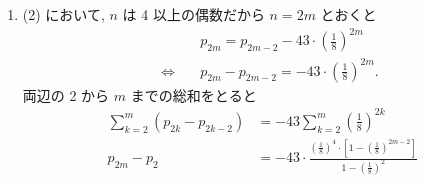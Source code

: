 \begin{qenumerate}
{\begin{enumerate}
{\begin{enumerate}
					\item{
						$n - 2$ 回さいころを投げた時点で $x_{n - 2} < \dfrac{8}{33}$ かつ $x_{n - 2}\neq 0.\underbrace{24\dots 24}_{n - 2}$ である場合, $n - 1$ 回目と $n$ 回目の出た目に関わらず $x_{n} < \dfrac{8}{33}$ を満たす.
						この確率を $p'_{n}$ とおくと, $x_{n - 2} < \dfrac{8}{33}$ となる確率は $p_{n - 2}$ であり, $x_{n - 2} = 0.\underbrace{24\dots 24}_{n - 2}$ となる確率は $\left(\dfrac{1}{8}\right)^{n - 2}$ だから
						\begin{align}
							p'_{n} = p_{n - 2} - \left(\frac{1}{8}\right)^{n - 2}.
						\end{align}
					}
					\item{
						$n - 2$ 回さいころを投げた時点で $x_{n - 2} = 0.\underbrace{24\dots 24}_{n - 2}$ である場合, $n - 1$ 回目, $n$ 回目の出る目が (1) と同様のときに $x_{n} < \dfrac{8}{33}$ を満たし, その確率を $p''_{n}$ とおくと
						\begin{align}
							p''_{n} = \left(\frac{1}{8}\right)^{n - 2}\cdot\frac{21}{64}.
						\end{align}
					}
				\end{enumerate}
				以上より, 求める確率は
				\begin{align}
					p_{n} &= p'_{n} + p''_{n} \\
						&= p_{n - 2} - \left(\frac{1}{8}\right)^{n - 2} + \left(\frac{1}{8}\right)^{n - 2}\cdot\frac{21}{64} \\
						&= p_{n - 2} - \frac{43}{8^{2}}\cdot\left(\frac{1}{8}\right)^{n - 2} \\
						&= \red{p_{n - 2} - 43\cdot\left(\frac{1}{8}\right)^{n}}.
				\end{align}
			}
			\item{
				(2) において, $n$ は 4 以上の偶数だから $n = 2m$ とおくと
				\begin{align}
					&p_{2m} = p_{2m - 2} - 43\cdot\left(\frac{1}{8}\right)^{2m} \\
					\quad\Leftrightarrow\quad &p_{2m} - p_{2m - 2} = -43\cdot\left(\frac{1}{8}\right)^{2m}.
				\end{align}
				両辺の 2 から $m$ までの総和をとると
				\begin{align}
					\sum_{k = 2}^{m}{\left(p_{2k} - p_{2k - 2}\right)} &= -43\sum_{k = 2}^{m}{\left(\frac{1}{8}\right)^{2k}} \\
					p_{2m} - p_{2} &= -43\cdot\frac{\left(\frac{1}{8}\right)^{4}\cdot\left[1 - \left(\frac{1}{8}\right)^{2m - 2}\right]}{1 - \left(\frac{1}{8}\right)^{2}}\\

\end{align}}
\end{enumerate}}
\end{qenumerate}
